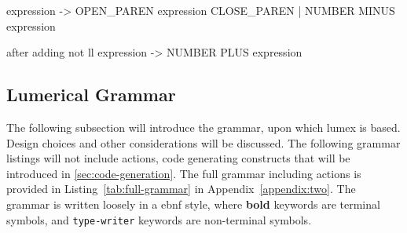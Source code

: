  expression -> OPEN\_PAREN expression CLOSE\_PAREN
            |  NUMBER MINUS expression

after adding not ll
 expression -> NUMBER PLUS expression





\subsection{Lumerical Grammar}
The following subsection will introduce the grammar, upon which \gls{lumex} is based. Design choices and other considerations will be discussed. The following grammar listings will not include actions, code generating constructs that will be introduced in \cref{sec:code-generation}. The full grammar including actions is provided in Listing~\ref{tab:full-grammar} in Appendix~\ref{appendix:two}. The grammar is written loosely in a \gls{ebnf} style, where \textbf{bold} keywords are terminal symbols, and \texttt{type-writer} keywords are non-terminal symbols. 


